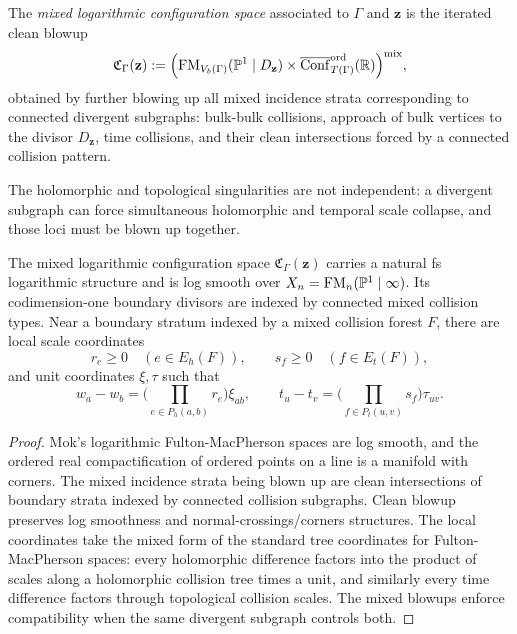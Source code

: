 \begin{definition}\label{def:mixed-log-config}
The \emph{mixed logarithmic configuration space} associated to $\Gamma$ and $\mathbf z$ is the iterated clean blowup
\[
 \mathfrak C_\Gamma(\mathbf z)
 :=
 \Big(
 \mathrm{FM}_{V_b(\Gamma)}(\mathbb P^1\mid D_{\mathbf z})
 \times
 \overline{\mathrm{Conf}}^{\mathrm{ord}}_{T(\Gamma)}(\mathbb R)
 \Big)^{\mathrm{mix}},
\]
obtained by further blowing up all mixed incidence strata corresponding to connected divergent subgraphs: bulk-bulk collisions, approach of bulk vertices to the divisor $D_{\mathbf z}$, time collisions, and their clean intersections forced by a connected collision pattern.
\end{definition}

The holomorphic and topological singularities are not independent: a divergent subgraph can force simultaneous holomorphic and temporal scale collapse, and those loci must be blown up together.

\begin{proposition}\label{prop:mixed-log-smooth}
The mixed logarithmic configuration space $\mathfrak C_\Gamma(\mathbf z)$ carries a natural fs logarithmic structure and is log smooth over $X_n=\mathrm{FM}_n(\mathbb P^1\mid\infty)$. Its codimension-one boundary divisors are indexed by connected mixed collision types. Near a boundary stratum indexed by a mixed collision forest $F$, there are local scale coordinates
\[
 r_e\ge 0 \quad (e\in E_h(F)),
 \qquad
 s_f\ge 0 \quad (f\in E_t(F)),
\]
and unit coordinates $\xi,\tau$ such that
\[
 w_a-w_b = \Big(\prod_{e\in P_h(a,b)}r_e\Big)\xi_{ab},
 \qquad
 t_u-t_v = \Big(\prod_{f\in P_t(u,v)}s_f\Big)\tau_{uv}.
\]
\end{proposition}

\begin{proof}
Mok's logarithmic Fulton-MacPherson spaces are log smooth, and the ordered real compactification of ordered points on a line is a manifold with corners. The mixed incidence strata being blown up are clean intersections of boundary strata indexed by connected collision subgraphs. Clean blowup preserves log smoothness and normal-crossings/corners structures. The local coordinates take the mixed form of the standard tree coordinates for Fulton-MacPherson spaces: every holomorphic difference factors into the product of scales along a holomorphic collision tree times a unit, and similarly every time difference factors through topological collision scales. The mixed blowups enforce compatibility when the same divergent subgraph controls both.
\end{proof}

